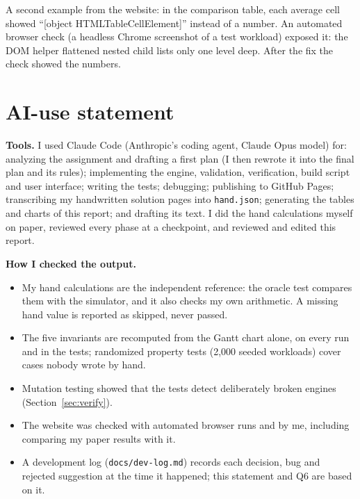 \documentclass[11pt,a4paper]{article}
\begin{document}
A second example from the website: in the comparison table, each average cell showed
``[object HTMLTableCellElement]'' instead of a number. An automated browser check (a headless Chrome screenshot of a
test workload) exposed it: the DOM helper flattened nested child lists only one level deep. After the fix the check showed
the numbers.

\section{AI-use statement}

\textbf{Tools.} I used Claude Code (Anthropic's coding agent, Claude Opus model) for: analyzing the assignment and drafting
a first plan (I then rewrote it into the final plan and its rules); implementing the engine, validation, verification,
build script and user interface; writing the tests; debugging; publishing to GitHub Pages; transcribing my handwritten
solution pages into \texttt{hand.json}; generating the tables and charts of this report; and drafting its text. I did the
hand calculations myself on paper, reviewed every phase at a checkpoint, and reviewed and edited this report.

\textbf{How I checked the output.}
\begin{itemize}
  \item My hand calculations are the independent reference: the oracle test compares them with the simulator, and it also
    checks my own arithmetic. A missing hand value is reported as skipped, never passed.
  \item The five invariants are recomputed from the Gantt chart alone, on every run and in the tests; randomized
    property tests (2,000 seeded workloads) cover cases nobody wrote by hand.
  \item Mutation testing showed that the tests detect deliberately broken engines (Section~\ref{sec:verify}).
  \item The website was checked with automated browser runs and by me, including comparing my paper results with it.
  \item A development log (\texttt{docs/dev-log.md}) records each decision, bug and rejected suggestion at the time it
    happened; this statement and Q6 are based on it.
\end{itemize}
\end{document}
